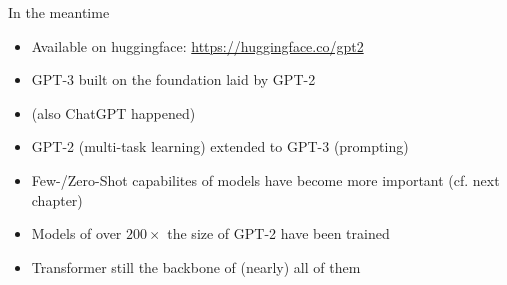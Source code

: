 
\begin{frame}{In the meantime}

\vfill

\begin{itemize}
	\item Available on huggingface: \url{https://huggingface.co/gpt2}
	\item GPT-3 built on the foundation laid by GPT-2
	\item (also ChatGPT happened)
	\item GPT-2 (multi-task learning) extended to
	GPT-3 (prompting)
	\item Few-/Zero-Shot capabilites of models have become more important (cf. next chapter)
	\item Models of over $200\times$ the size of GPT-2 have been trained
	\item Transformer still the backbone of (nearly) all of them
\end{itemize}

\vfill

\end{frame}


\endlecture

